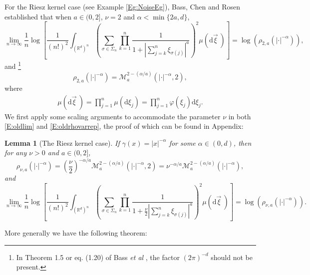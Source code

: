 \documentclass[12pt]{report}
\theoremstyle{plain}
\newtheorem{lemma}[theorem]{Lemma}
\theoremstyle{definition}
\numberwithin{equation}{section}
\newcommand{\R}{\mathbb{R}}
\newcommand{\ud}{\ensuremath{ \mathrm{d} }}
\begin{document}
For the Riesz kernel case (see Example \ref{Eg:NoiseEg}), Bass, Chen and Rosen \cite{bass.chen.ea:09:large}
established that when $a \in (0,2]$, $\nu = 2$ and $\alpha < \min\{2a,d\}$,
\begin{equation} \label{E:oldlim}
\lim_{n \to \infty} \frac{1}{n} \log \left[ \frac{1}{(n!)^2} \int_{(\R^d)^n} \left( \sum_{\sigma \in \Sigma_n} \prod_{k=1}^n \frac{1}{1+ |\sum_{j=k}^n \xi_{\sigma(j)}|^a}\right)^2 \mu (\ud \vec{\xi}\:)\right]
= \log\left( \rho_{2,a}\left(|\cdot|^{-\alpha}\right) \right),
\end{equation}
and \footnote{In Theorem 1.5 or eq. (1.20) of Bass {\it et al} \cite{bass.chen.ea:09:large}, the factor
	$(2\pi)^{-d}$ should not be present.}
\begin{equation} \label{E:oldrhovarrep}
\rho_{2,a} \left(|\cdot|^{-\alpha}\right) = \mathcal{M}_a^{2-(\alpha/a)}\left(|\cdot|^{-\alpha},2\right),
\end{equation}
where
\begin{align} \label{E:muvec}
\mu(\ud \vec{\xi}\:) = \prod_{j=1}^n \mu(\ud \xi_j)= \prod_{j=1}^n \varphi(\xi_j) \ud \xi_j.
\end{align}
We first apply some scaling arguments to accommodate the parameter $\nu$ in both \eqref{E:oldlim}
and \eqref{E:oldrhovarrep}, the proof of which can be found in Appendix:

\begin{lemma}[The Riesz kernel case] \label{L:rhovar}
	If $\gamma(x) = |x|^{-\alpha}$ for some $\alpha \in (0,d)$, then for any $\nu >0 $ and $a \in
	(0,2]$,
	\begin{equation} \label{E:rhoLam}
	\rho_{\nu, a}\left(|\cdot|^{-\alpha}\right) = \left(\frac{\nu}{2}\right)^{-\alpha/a} \mathcal{M}_a^{2-(\alpha/a)}\left(|\cdot|^{-\alpha},2\right)
	= \nu^{-\alpha / a}\mathcal{M}_a^{2-(\alpha / a)}(|\cdot|^{-\alpha}),
	\end{equation}
	and
	\begin{equation} \label{E:LogRhoRiez}
	\lim_{n \to \infty} \frac{1}{n} \log \left[ \frac{1}{(n!)^2} \int_{(\R^d)^n} \left( \sum_{\sigma \in \Sigma_n} \prod_{k=1}^n \frac{1}{1+ \frac{\nu}{2}|\sum_{j=k}^n \xi_{\sigma(j)}|^a}\right)^2 \mu (\ud \vec{\xi}\:)\right]
	= \log\left( \rho_{\nu, a}\left(|\cdot|^{-\alpha}\right) \right).
	\end{equation}
\end{lemma}

More generally we have the following theorem:
\end{document}
